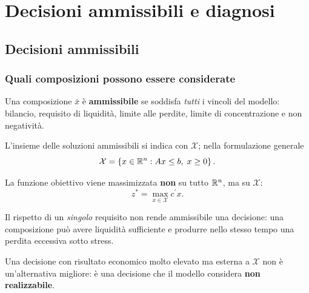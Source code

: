 

\section{Decisioni ammissibili e diagnosi}



\subsection{Decisioni ammissibili}%

\begin{frame}%
%

\frametitle{Quali composizioni possono essere considerate}%
%

%


Una composizione $\bar{x}$ \`{e} \textbf{ammissibile} se soddisfa \emph{tutti}
i vincoli del modello: bilancio, requisito di liquidit\`{a}, limite alle
perdite, limite di concentrazione e non negativit\`{a}.

\medskip

L'insieme delle soluzioni ammissibili si indica con $\mathcal{X}$; nella
formulazione generale
\[
\mathcal{X}=\left\{  x\in\mathbb{R}^{n}:Ax\leq b,\;x\geq0\right\}  .
\]


La funzione obiettivo viene massimizzata \textbf{non} su tutto $\mathbb{R}^{n}$, ma su
$\mathcal{X}$:
\[
z^{*}=\max_{x\in\mathcal{X}}c^{\prime}x.
\]


\medskip

\begin{stepitemize}
\item Il rispetto di un \emph{singolo} requisito non rende ammissibile una
decisione: una composizione pu\`{o} avere liquidit\`{a} sufficiente e produrre
nello stesso tempo una perdita eccessiva sotto stress.

\item Una decisione con risultato economico molto elevato ma esterna a
$\mathcal{X}$ non \`{e} un'alternativa migliore: \`{e} una decisione che il
modello considera \textbf{non realizzabile}.
\end{stepitemize}

%

\transboxout
\end{frame}%


